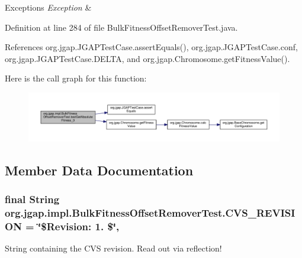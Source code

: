 \begin{DoxyExceptions}{Exceptions}
{\em Exception} & \\
\hline
\end{DoxyExceptions}


Definition at line 284 of file Bulk\-Fitness\-Offset\-Remover\-Test.\-java.



References org.\-jgap.\-J\-G\-A\-P\-Test\-Case.\-assert\-Equals(), org.\-jgap.\-J\-G\-A\-P\-Test\-Case.\-conf, org.\-jgap.\-J\-G\-A\-P\-Test\-Case.\-D\-E\-L\-T\-A, and org.\-jgap.\-Chromosome.\-get\-Fitness\-Value().



Here is the call graph for this function\-:
\nopagebreak
\begin{figure}[H]
\begin{center}
\leavevmode
\includegraphics[width=350pt]{classorg_1_1jgap_1_1impl_1_1_bulk_fitness_offset_remover_test_aa92a14a7d2ec8c15dc845a02ab56ad70_cgraph}
\end{center}
\end{figure}




\subsection{Member Data Documentation}
\hypertarget{classorg_1_1jgap_1_1impl_1_1_bulk_fitness_offset_remover_test_ac70f40c6296c050d30a1c5447faaa52a}{
\subsubsection[{C\-V\-S\-\_\-\-R\-E\-V\-I\-S\-I\-O\-N}]{\setlength{\rightskip}{0pt plus 5cm}final String org.\-jgap.\-impl.\-Bulk\-Fitness\-Offset\-Remover\-Test.\-C\-V\-S\-\_\-\-R\-E\-V\-I\-S\-I\-O\-N = \char`\"{}\$Revision\-: 1. \$\char`\"{}\hspace{0.3cm}{\ttfamily [static]}, {\ttfamily [private]}}}\label{classorg_1_1jgap_1_1impl_1_1_bulk_fitness_offset_remover_test_ac70f40c6296c050d30a1c5447faaa52a}
String containing the C\-V\-S revision. Read out via reflection! 

